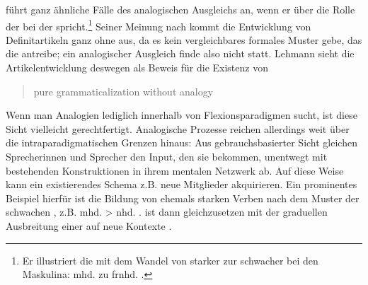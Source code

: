 \textcite[160]{Lehmann2004} führt ganz ähnliche Fälle des analogischen Ausgleichs an, wenn er über die Rolle der  bei der  spricht.\footnote{Er illustriert die  mit dem  Wandel von starker zur schwacher  bei den  Maskulina: mhd.  zu frnhd. .} Seiner Meinung nach kommt die Entwicklung von Definitartikeln ganz ohne  aus, da es kein vergleichbares formales Muster gebe, das die   antreibe; ein analogischer Ausgleich  finde also nicht statt. Lehmann sieht die Artikelentwicklung deswegen als Beweis für die Existenz von \blockcquote[161]{Lehmann2004}{pure grammaticalization without analogy}. 

Wenn man Analogien  lediglich innerhalb von Flexionsparadigmen sucht, ist diese Sicht vielleicht gerechtfertigt. Analogische Prozesse  reichen allerdings weit über die intraparadigmatischen Grenzen hinaus: Aus gebrauchsbasierter Sicht gleichen Sprecherinnen und Sprecher den Input, den sie bekommen, unentwegt mit bestehenden Konstruktionen  in ihrem mentalen Netzwerk ab. Auf diese Weise kann ein existierendes Schema z.B. neue Mitglieder akquirieren. Ein prominentes Beispiel hierfür ist die Bildung von ehemals starken Verben nach dem Muster der schwachen , z.B. mhd.  > nhd.  \parencite{Bittner1985}.  ist dann gleichzusetzen mit der graduellen Ausbreitung einer   auf neue Kontexte \parencite[57--58]{Bybee2010}. %

